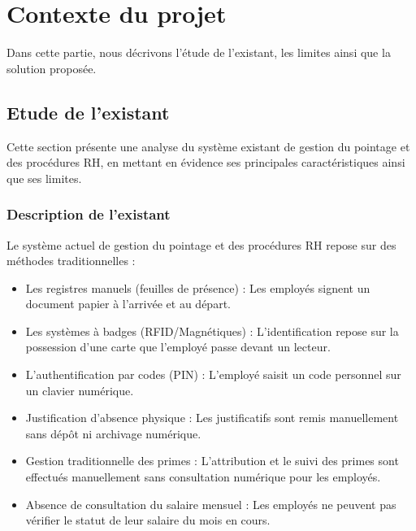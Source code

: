 \section{Contexte du projet}
Dans cette partie, nous décrivons l'étude de l'existant, les limites ainsi que la solution proposée.
\subsection{Etude de l'existant}
Cette section présente une analyse du système existant de gestion du pointage et des procédures RH, en mettant en évidence ses principales caractéristiques ainsi que ses limites. 
\subsubsection{Description de l'existant}
Le système actuel de gestion du pointage et des procédures RH repose sur des méthodes traditionnelles :
\begin{itemize}
\item Les registres manuels (feuilles de présence) : Les employés signent un document papier à l’arrivée et au départ.

\item  Les systèmes à badges (RFID/Magnétiques) : L’identification repose sur la possession d’une carte que l’employé passe devant un lecteur.

\item L’authentification par codes (PIN) : L’employé saisit un code personnel sur un clavier numérique.
\item Justification d’absence physique : Les justificatifs sont remis manuellement sans dépôt ni archivage numérique.
\item Gestion traditionnelle des primes : L’attribution et le suivi des primes sont effectués manuellement sans consultation numérique pour les employés.
\item Absence de consultation du salaire mensuel : Les employés ne peuvent pas vérifier le statut de leur salaire du mois en cours.

\end{itemize}

